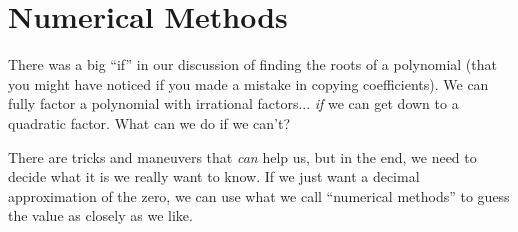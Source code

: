 \section{Numerical Methods} 
There was a big ``if'' in our discussion of finding the roots of a polynomial (that you might have noticed if you made a mistake in copying coefficients). We can fully factor a polynomial with irrational factors... \emph{if} we can get down to a quadratic factor. What can we do if we can't?

There are tricks and maneuvers that \emph{can} help us, but in the end, we need to decide what it is we really want to know. If we just want a decimal approximation of the zero, we can use what we call ``numerical methods'' to guess the value as closely as we like.

 
 
 
 
